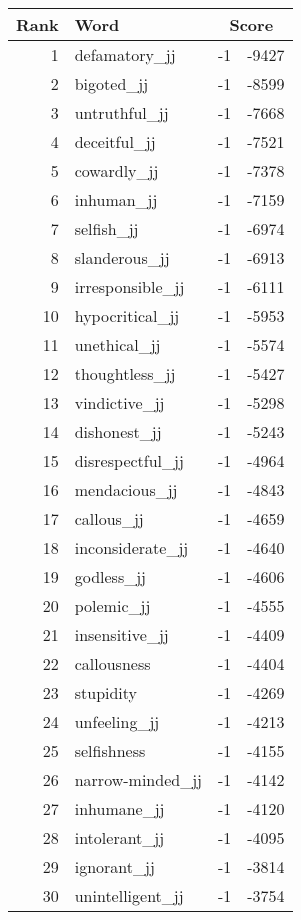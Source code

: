 \begin{longtable}[!htbp]{| rlr@{.}l |}
    \hline
    \textbf{Rank} & \textbf{Word} & \multicolumn{2}{c|}{\textbf{Score}} \\
    \hline
    \endhead
    1 & defamatory\_jj & -1 & -9427 \\
    2 & bigoted\_jj & -1 & -8599 \\
    3 & untruthful\_jj & -1 & -7668 \\
    4 & deceitful\_jj & -1 & -7521 \\
    5 & cowardly\_jj & -1 & -7378 \\
    6 & inhuman\_jj & -1 & -7159 \\
    7 & selfish\_jj & -1 & -6974 \\
    8 & slanderous\_jj & -1 & -6913 \\
    9 & irresponsible\_jj & -1 & -6111 \\
    10 & hypocritical\_jj & -1 & -5953 \\
    11 & unethical\_jj & -1 & -5574 \\
    12 & thoughtless\_jj & -1 & -5427 \\
    13 & vindictive\_jj & -1 & -5298 \\
    14 & dishonest\_jj & -1 & -5243 \\
    15 & disrespectful\_jj & -1 & -4964 \\
    16 & mendacious\_jj & -1 & -4843 \\
    17 & callous\_jj & -1 & -4659 \\
    18 & inconsiderate\_jj & -1 & -4640 \\
    19 & godless\_jj & -1 & -4606 \\
    20 & polemic\_jj & -1 & -4555 \\
    21 & insensitive\_jj & -1 & -4409 \\
    22 & callousness & -1 & -4404 \\
    23 & stupidity & -1 & -4269 \\
    24 & unfeeling\_jj & -1 & -4213 \\
    25 & selfishness & -1 & -4155 \\
    26 & narrow-minded\_jj & -1 & -4142 \\
    27 & inhumane\_jj & -1 & -4120 \\
    28 & intolerant\_jj & -1 & -4095 \\
    29 & ignorant\_jj & -1 & -3814 \\
    30 & unintelligent\_jj & -1 & -3754 \\

\end{longtable}
